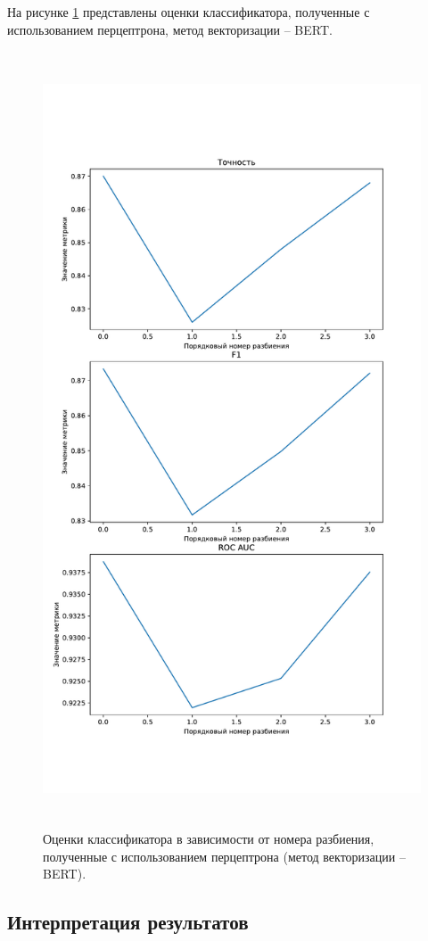 На рисунке \ref{img:perceptronMetricsBert} представлены оценки классификатора, полученные с использованием перцептрона, метод векторизации -- BERT.
\begin{figure}[H]
	\centering
	\includegraphics[height=23cm]{inc/plots/perceptronMetricsBert.pdf}
	\caption{ Оценки классификатора в зависимости от номера разбиения, полученные с использованием перцептрона (метод векторизации -- BERT). }
	\label{img:perceptronMetricsBert}
\end{figure}

\subsection{Интерпретация результатов}

